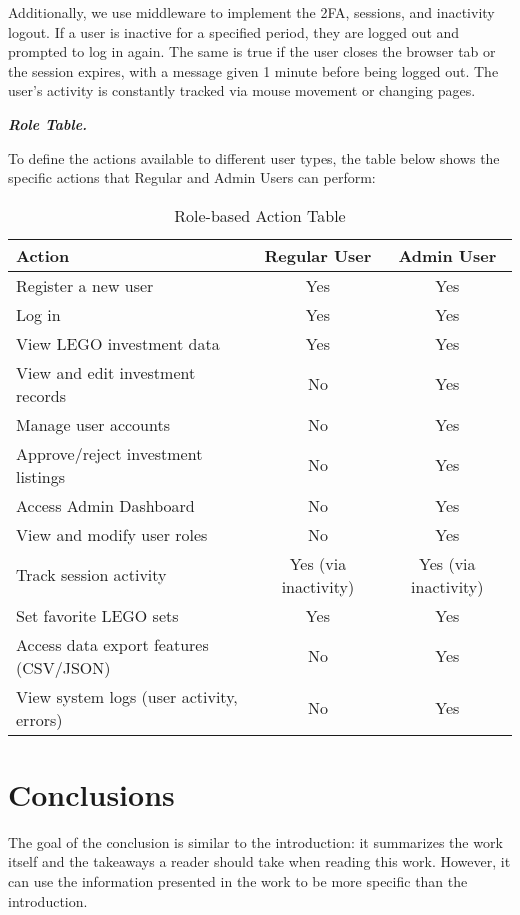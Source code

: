 \documentclass[letterpaper,twocolumn]{article}
\newcommand{\myparagraph}[1]{\vspace{0.1cm}\noindent \textbf{\textit{#1.}}}
\begin{document}
Additionally, we use middleware to implement the 2FA, sessions, and inactivity logout. If a user is inactive for a specified period, they are logged out and prompted to log in again. The same is true if the user closes the browser tab or the session expires, with a message given 1 minute before being logged out. The user's activity is constantly tracked via mouse movement or changing pages.

\myparagraph{Role Table}

To define the actions available to different user types, the table below shows the specific actions that Regular and Admin Users can perform:

\begin{table}[h!]
\centering
\begin{tabular}{|l|c|c|}
\hline
\textbf{Action} & \textbf{Regular User} & \textbf{Admin User} \\ \hline
Register a new user & Yes & Yes \\ \hline
Log in & Yes & Yes \\ \hline
View LEGO investment data & Yes & Yes \\ \hline
View and edit investment records & No & Yes \\ \hline
Manage user accounts & No & Yes \\ \hline
Approve/reject investment listings & No & Yes \\ \hline
Access Admin Dashboard & No & Yes \\ \hline
View and modify user roles & No & Yes \\ \hline
Track session activity & Yes (via inactivity) & Yes (via inactivity) \\ \hline
Set favorite LEGO sets & Yes & Yes \\ \hline
Access data export features (CSV/JSON) & No & Yes \\ \hline
View system logs (user activity, errors) & No & Yes \\ \hline
\end{tabular}
\caption{Role-based Action Table}
\end{table}

\section{Conclusions}

The goal of the conclusion is similar to the introduction: it summarizes the work itself and the takeaways a reader should take when reading this work. However, it can use the information presented in the work to be more specific than the introduction.
\end{document}

